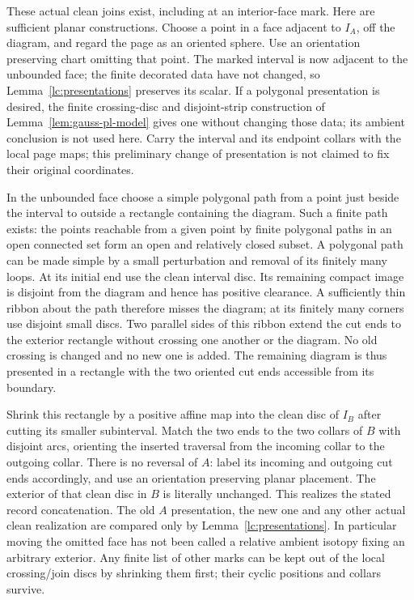 These actual clean joins exist, including at an interior-face mark.
Here are sufficient planar constructions. Choose a point in a face
adjacent to $I_A$, off the diagram, and regard the page as an oriented
sphere. Use an orientation preserving chart omitting that point. The
marked interval is now adjacent to the unbounded face; the finite
decorated data have not changed, so Lemma~\ref{lc:presentations} preserves its
scalar. If a polygonal presentation is desired, the finite crossing-disc
and disjoint-strip construction of Lemma~\ref{lem:gauss-pl-model}
gives one without changing those data; its ambient conclusion is not
used here. Carry the interval and its endpoint collars with the local
page maps; this preliminary change of presentation is not claimed to
fix their original coordinates.

In the unbounded face choose a simple polygonal path from a point just
beside the interval to outside a rectangle containing the diagram.
Such a finite path exists: the points reachable from a given point by
finite polygonal paths in an open connected set form an open and
relatively closed subset. A polygonal path can be made simple by a small
perturbation and removal of its finitely many loops. At its initial end
use the clean interval disc. Its remaining compact image is disjoint
from the diagram and hence has positive clearance. A sufficiently thin
ribbon about the path therefore misses the diagram; at its finitely
many corners use disjoint small discs. Two parallel sides of this
ribbon extend the cut ends to the exterior rectangle without crossing
one another or the diagram. No old crossing is changed and no new one
is added. The remaining diagram is thus presented in a rectangle with
the two oriented cut ends accessible from its boundary.

Shrink this rectangle by a positive affine map into the clean disc of
$I_B$ after cutting its smaller subinterval. Match the two ends to the
two collars of $B$ with disjoint arcs, orienting the inserted traversal
from the incoming collar to the outgoing collar. There is no reversal
of $A$: label its incoming and outgoing cut ends accordingly, and use
an orientation preserving planar placement. The exterior of that clean
disc in $B$ is literally unchanged. This realizes the stated record
concatenation. The old $A$ presentation, the new one and any other
actual clean realization are compared only by Lemma~\ref{lc:presentations}.
In particular moving the omitted face has not been called a relative
ambient isotopy fixing an arbitrary exterior. Any finite list of other
marks can be kept out of the local crossing/join discs by shrinking
them first; their cyclic positions and collars survive.

